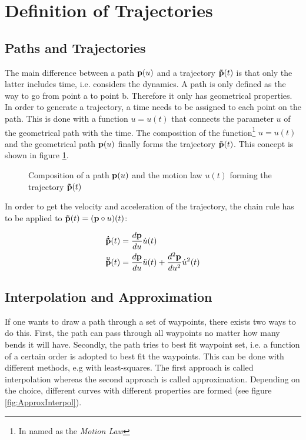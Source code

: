 \section{Definition of Trajectories}
\label{sec:definition}
\subsection{Paths and Trajectories}
The main difference between a path $ {\bf p}(u)$ and a trajectory $ {\bf \tilde{p}}(t)$ is that only the latter includes time, i.e. considers the dynamics. A path is only defined as the way to go from point a to point b. Therefore it only has geometrical properties. In order to generate a trajectory, a time needs to be assigned to each point on the path. This is done with a function $u=u(t)$ that connects the parameter $u$ of the geometrical path with the time. The composition of the function\footnote{In  \cite{snider} named as the \textit{Motion Law}} $u=u(t)$ and the geometrical path ${\bf p}(u)$ finally forms the trajectory ${\bf \tilde{p}}(t)$. This concept is shown in figure \ref{fig:path_trajectory}.
\begin{figure}[H]
\centering
\def\svgwidth{0.9\textwidth}

\caption{Composition of a path ${\bf p}(u)$ and the motion law $u(t)$ forming the trajectory ${\bf \tilde{p}}(t)$}
\label{fig:path_trajectory}
\end{figure}

In order to get the velocity and acceleration of the trajectory, the chain rule has to be applied to ${\bf \tilde{p}}(t)=({\bf p}\circ u)(t)$:

\begin{align}\label{vel_acc}
{\bf \dot{\tilde{p}}}(t) &= \frac{d {\bf p}}{du}\dot{u}(t) \\
{\bf \ddot{\tilde{p}}}(t) &= \frac{d {\bf p}}{du}\ddot{u}(t)+\frac{d^{2} {\bf p}}{du^{2}}\dot{u}^{2}(t)
\end{align}






\subsection{Interpolation and Approximation}
If one wants to draw a path through a set of waypoints, there exists two ways to do this. First, the path can pass through all waypoints no matter how many bends it will have. Secondly, the path tries to best fit waypoint set, i.e. a function of a  certain order is adopted to best fit the waypoints. This can be done with different methods, e.g with least-squares. The first approach is called interpolation whereas the second approach is called approximation. Depending on the choice, different curves with different properties are formed (see figure \ref{fig:ApproxInterpol}).  


